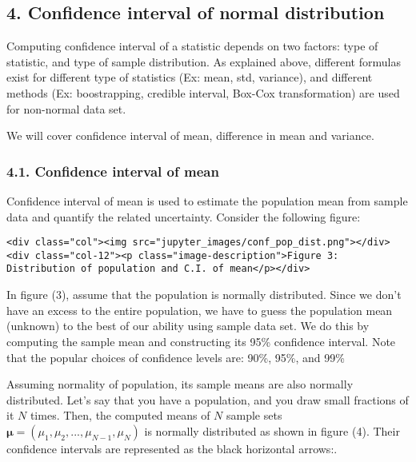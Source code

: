 \documentclass[11pt]{article}
\begin{document}
    \hypertarget{Confidenceux20intervalux20ofux20differentux20statistics}{}

\subsection{4. Confidence interval of normal
distribution}\label{confidence-interval-of-normal-distribution}

Computing confidence interval of a statistic depends on two factors:
type of statistic, and type of sample distribution. As explained above,
different formulas exist for different type of statistics (Ex: mean,
std, variance), and different methods (Ex: boostrapping, credible
interval, Box-Cox transformation) are used for non-normal data set.

We will cover confidence interval of mean, difference in mean and
variance.

    \hypertarget{conf_int_of_mean}{}

\subsubsection{4.1. Confidence interval of
mean}\label{confidence-interval-of-mean}

Confidence interval of mean is used to estimate the population mean from
sample data and quantify the related uncertainty. Consider the following
figure:

\hypertarget{fig3}{}
\begin{verbatim}
<div class="col"><img src="jupyter_images/conf_pop_dist.png"></div>
<div class="col-12"><p class="image-description">Figure 3: Distribution of population and C.I. of mean</p></div>
\end{verbatim}

In figure (3), assume that the population is normally distributed. Since
we don't have an excess to the entire population, we have to guess the
{population mean (unknown)} to the best of our ability using sample data
set. We do this by computing the {sample mean} and constructing its
{95\% confidence interval}. Note that the popular choices of confidence
levels are: 90\%, 95\%, and 99\%

Assuming normality of population, its sample means are also normally
distributed. Let's say that you have a population, and you draw small
fractions of it \(N\) times. Then, the computed means of \(N\) sample
sets \(\boldsymbol{\mu}=(\mu_1, \mu_2,..., \mu_{N-1}, \mu_N)\) is
normally distributed as shown in figure (4). Their confidence intervals
are represented as the black horizontal arrows:.
\end{document}
